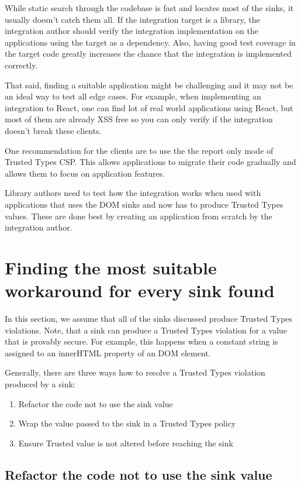 While static search through the codebase is fast and locates most of the sinks, it usually doesn't
catch them all. If the integration target is a library, the integration author should verify the
integration implementation on the applications using the target as a dependency. Also, having good
test coverage in the target code greatly increases the chance that the integration is
implemented correctly.

That said, finding a suitable application might be challenging and it may not be an ideal way to
test all edge cases. For example, when implementing an integration to React, one can find lot of
real world applications using React, but most of them are already XSS free so you can only verify if
the integration doesn't break these clients.

One recommendation for the clients are to use the the report only mode of Trusted Types CSP. This
allows applications to migrate their code gradually and allows them to focus on application
features.

Library authors need to test how the integration works when used with applications that uses the
DOM sinks and now has to produce Trusted Types values. These are done best by creating an
application from scratch by the integration author.

\section{Finding the most suitable workaround for every sink found}

In this section, we assume that all of the sinks discussed produce Trusted Types violations. Note,
that a sink can produce a Trusted Types violation for a value that is provably secure. For example,
this happens when a constant string is assigned to an innerHTML property of an DOM element.

Generally, there are three ways how to resolve a Trusted Types violation produced by a sink:

\begin{enumerate}
  \item Refactor the code not to use the sink value
  \item Wrap the value passed to the sink in a Trusted Types policy
  \item Ensure Trusted value is not altered before reaching the sink
\end{enumerate}

\subsection{Refactor the code not to use the sink value}

